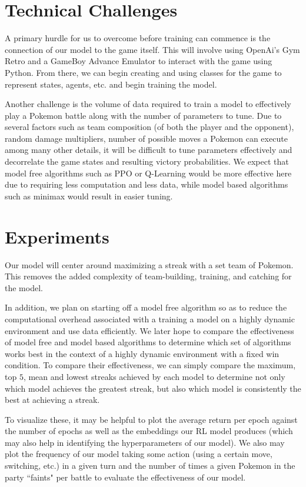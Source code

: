 \documentclass[10pt,twocolumn,letterpaper]{article}
\begin{document}
\section{Technical Challenges}

A primary hurdle for us to overcome before training can commence is the connection of our model to
the game itself. This will involve using OpenAi's Gym Retro and a GameBoy Advance Emulator to interact
with the game using Python. From there, we can begin creating and using classes for the game
to represent states, agents, etc. and begin training the model. 

Another challenge is the volume of data required to train a model to effectively play a Pokemon battle along with the number of parameters to tune. Due to several factors such as team composition (of both the player and the opponent), random damage multipliers, number of possible moves a Pokemon can execute among many other details, it will be difficult to tune parameters effectively and decorrelate the game states and resulting victory probabilities. We expect that model free algorithms such as PPO or Q-Learning would be more effective here due to requiring less computation and less data, while model based algorithms such as minimax would result in easier tuning. 

\section{Experiments}

Our model will center around maximizing a streak with a set team of Pokemon. This removes the added complexity of team-building, training, and catching for the model. 

    In addition, we plan on starting off a model free algorithm so as to reduce the computational overhead associated with a training a model on a highly dynamic environment and use data efficiently. We later hope to compare the effectiveness of model free and model based algorithms to determine which set of algorithms works best in the context of a highly dynamic environment with a fixed win condition. To compare their effectiveness, we can simply compare the maximum, top $5$, mean and lowest streaks achieved by each model to determine not only which model achieves the greatest streak, but also which model is consistently the best at achieving a streak. 

To visualize these, it may be helpful to plot the average return per epoch against the number of epochs as well as the embeddings our RL model produces (which may also help in identifying the hyperparameters of our model). We also may plot the frequency of our model taking some action (using a certain move, switching, etc.) in a given turn and the number of times a given Pokemon in the party ``faints" per battle to evaluate the effectiveness of our model.
\end{document}
